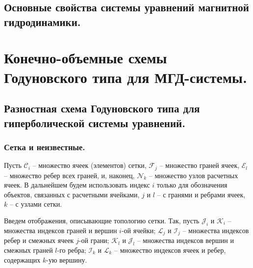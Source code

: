 \documentclass[14pt, a4paper, fleqn]{extreport}
\begin{document}
	\section{Основные свойства системы уравнений магнитной гидродинамики.}
	
	\chapter{Конечно-объемные схемы Годуновского типа
		     для МГД-системы.}

	\section{Разностная схема Годуновского типа для гиперболической системы уравнений.}

	\subsection{Сетка и неизвестные.}
	
	Пусть 
	$\mathcal{C}_i$ -- множество ячеек (элементов) сетки,
	$\mathcal{F}_j$ -- множество граней ячеек,
	$\mathcal{E}_l$ -- множество ребер всех граней, и, наконец,
	$\mathcal{N}_k$ -- множество узлов расчетных ячеек.
	В дальнейшем будем использовать индекс $i$ только для обозначения объектов, 
	связанных с расчетными ячейками, $j$ и $l$ -- с гранями и ребрами ячеек, $k$ -- с узлами сетки.
	
	Введем отображения, описывающие топологию сетки.
	Так, пусть 
	$\mathcal{J}_i$ и $\mathcal{K}_i$ -- множества индексов граней и вершин $i$-ой ячейки;
	$\mathcal{L}_j$ и $\mathcal{I}_j$ -- множества индексов ребер и смежных ячеек $j$-ой грани;
	$\mathcal{K}_l$ и $\mathcal{J}_l$ -- множества индексов вершин и смежных граней $l$-го ребра;
	$\mathcal{I}_k$ и $\mathcal{L}_k$ -- множество индексов ячеек и ребер, содержащих $k$-ую вершину.
	
\end{document}
